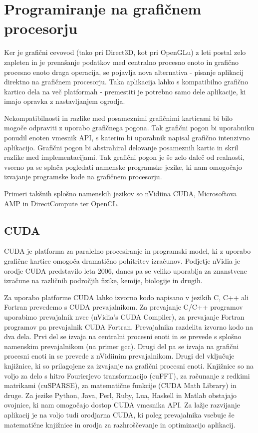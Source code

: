 \chapter{Programiranje na grafičnem\\ procesorju}
\label{sec:gpu}

Ker je grafični cevovod (tako pri Direct3D, kot pri OpenGLu) z leti postal zelo zapleten in je prenašanje podatkov med centralno procesno enoto in grafično procesno enoto draga operacija, se pojavlja nova alternativa - pisanje aplikacij direktno na grafičnem procesorju. Taka aplikacija lahko s kompatibilno grafično kartico dela na več platformah - premestiti je potrebno samo dele aplikacije, ki imajo opravka z nastavljanjem ogrodja. 

Nekompatibilnosti in razlike med posameznimi grafičnimi karticami bi bilo mogoče odpraviti z uporabo grafičnega pogona. Tak grafični pogon bi uporabniku ponudil enoten vmesnik API, s katerim bi uporabnik napisal grafično intenzivno aplikacijo. Grafični pogon bi abstrahiral delovanje posameznih kartic in skril razlike med implementacijami. Tak grafični pogon je še zelo daleč od realnosti, vseeno pa se splača pogledati namenske programske jezike, ki nam omogočajo izvajanje programske kode na grafičnem procesorju.

Primeri takšnih splošno namenskih jezikov so nVidiina CUDA, Microsoftova AMP in DirectCompute ter OpenCL.

\section{CUDA}
CUDA \cite{cuda} je platforma za paralelno procesiranje in programski model, ki z uporabo grafične kartice omogoča dramatično pohitritev izračunov. Podjetje nVidia je orodje CUDA predstavilo leta 2006, danes pa se veliko uporablja za znanstvene izračune na različnih področjih fizike, kemije, biologije in drugih.

Za uporabo platforme CUDA lahko izvorno kodo napisano v jezikih C, C++ ali Fortran prevedemo s CUDA prevajalnikom. Za prevajanje C/C++ programov uporabimo prevajalnik nvcc (nVidia's CUDA Compiler), za prevajanje Fortran programov pa prevajalnik CUDA Fortran. Prevajalnika razdelita izvorno kodo na dva dela. Prvi del se izvaja na centralni procesni enoti in se prevede s splošno namenskim prevajalnikom (na primer gcc). Drugi del pa se izvaja na grafični procesni enoti in se prevede z nVidiinim prevajalnikom. Drugi del vključuje knjižnice, ki so prilagojene za izvajanje na grafični procesni enoti. Knjižnice so na voljo za delo s hitro Fourierjevo transformacijo (cuFFT), za računanje z redkimi matrikami (cuSPARSE), za matematične funkcije (CUDA Math Library) in druge. Za jezike Python, Java, Perl, Ruby, Lua, Haskell in Matlab obstajajo ovojnice, ki nam omogočajo dostop CUDA vmesnika API. Za lažje razvijanje aplikacij je na voljo tudi orodjarna CUDA, ki poleg prevajalnika vsebuje še matematične knjižnice in orodja za razhroščevanje in optimizacijo aplikacij.

